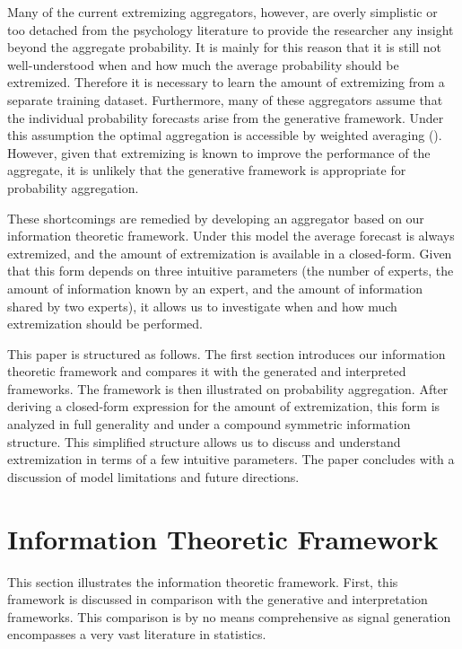 \documentclass[11pt,twoside]{article}
\begin{document}
Many of the current extremizing aggregators, however, are overly simplistic or too detached from the psychology literature to provide the researcher any insight beyond the aggregate probability. It is mainly for this reason that it is still not well-understood when and how much the average probability should be extremized. Therefore it is necessary to learn the amount of extremizing from a separate training dataset. Furthermore, many of these aggregators assume that the individual probability forecasts arise from the generative framework. Under this assumption the optimal aggregation is accessible by weighted averaging (\cite{parunak2013characterizing}). However, given that extremizing is known to improve the performance of the aggregate, it is unlikely that the generative framework is appropriate for probability aggregation.

These shortcomings are remedied by developing an aggregator based on our information theoretic framework. Under this model the average forecast is always extremized, and the amount of extremization is available in a closed-form. Given that this form depends on three intuitive parameters (the number of experts, the amount of information known by an expert, and the amount of information shared by two experts), it allows us to investigate when and how much extremization should be performed. 

This paper is structured as follows. The first section introduces our information theoretic framework and  compares it with the generated and interpreted frameworks. The framework is then illustrated on probability aggregation. After deriving a closed-form expression for the amount of extremization, this form is analyzed in full generality and under a compound symmetric information structure. This simplified structure allows us to discuss and understand extremization in terms of a few intuitive parameters. The paper concludes with a discussion of  model limitations and future directions. 



\section{Information Theoretic Framework}
This section illustrates the information theoretic framework. First, this framework is discussed in comparison with the generative and interpretation frameworks. This comparison is by no means comprehensive as signal generation encompasses a very vast literature in statistics. 
\end{document}
